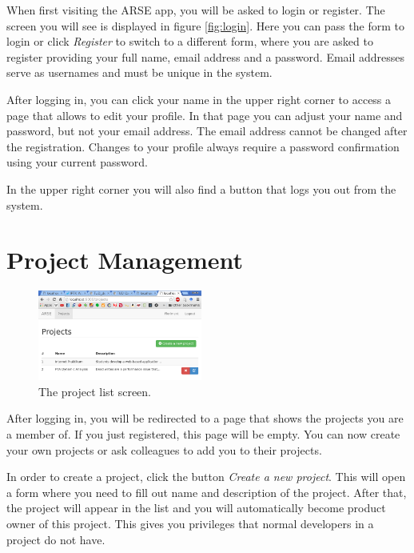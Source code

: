 \documentclass[
	accentcolor=tud1a %
]{tudreport}
\begin{document}
When first visiting the ARSE app, you will be asked to login or register. The screen you will see is displayed in figure \ref{fig:login}. Here you can pass the form to login or click \emph{Register} to switch to a different form, where you are asked to register providing your full name, email address and a password. Email addresses serve as usernames and must be unique in the system.

After logging in, you can click your name in the upper right corner to access a page that allows to edit your profile. In that page you can adjust your name and password, but not your email address. The email address cannot be changed after the registration. Changes to your profile always require a password confirmation using your current password.

In the upper right corner you will also find a button that logs you out from the system.

\section{Project Management}
\label{sec:project-mgmt}

\begin{figure}
	\centering
	\includegraphics[width=0.48\textwidth]{img/projects}
	\caption{The project list screen.}
	\label{fig:project-list}
\end{figure}

After logging in, you will be redirected to a page that shows the projects you are a member of. If you just registered, this page will be empty. You can now create your own projects or ask colleagues to add you to their projects.

In order to create a project, click the button \emph{Create a new project}. This will open a form where you need to fill out name and description of the project. After that, the project will appear in the list and you will automatically become product owner of this project. This gives you privileges that normal developers in a project do not have.
\end{document}
